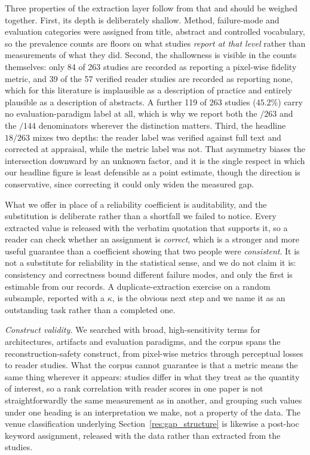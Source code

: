 \documentclass[review,authoryear]{elsarticle}
\begin{document}
Three properties of the extraction layer follow from that and should be weighed together.
First, its depth is deliberately shallow. Method, failure-mode and evaluation categories
were assigned from title, abstract and controlled vocabulary, so the prevalence counts are
floors on what studies \emph{report at that level} rather than measurements of what they
did. Second, the shallowness is visible in the counts themselves: only 84 of 263 studies
are recorded as reporting a pixel-wise fidelity metric, and 39 of the 57 verified reader
studies are recorded as reporting none, which for this literature is implausible as a
description of practice and entirely plausible as a description of abstracts. A further
119 of 263 studies ($45.2\%$) carry no evaluation-paradigm label at all, which is why we
report both the $/263$ and the $/144$ denominators wherever the distinction matters. Third,
the headline $18/263$ mixes two depths: the reader label was verified against full text and
corrected at appraisal, while the metric label was not. That asymmetry biases the
intersection downward by an unknown factor, and it is the single respect in which our
headline figure is least defensible as a point estimate, though the direction is
conservative, since correcting it could only widen the measured gap.

What we offer in place of a reliability coefficient is auditability, and the substitution is
deliberate rather than a shortfall we failed to notice. Every extracted value is released
with the verbatim quotation that supports it, so a reader can check whether an assignment is
\emph{correct}, which is a stronger and more useful guarantee than a coefficient showing
that two people were \emph{consistent}. It is not a substitute for reliability in the
statistical sense, and we do not claim it is: consistency and correctness bound different
failure modes, and only the first is estimable from our records. A duplicate-extraction
exercise on a random subsample, reported with a $\kappa$, is the obvious next step and we
name it as an outstanding task rather than a completed one.

\emph{Construct validity.} We searched with broad, high-sensitivity terms for
architectures, artifacts and evaluation paradigms, and the corpus spans the
reconstruction-safety construct, from pixel-wise metrics through perceptual losses to
reader studies. What the corpus cannot guarantee is that a metric means the same thing
wherever it appears: studies differ in what they treat as the quantity of interest, so
a rank correlation with reader scores in one paper is not straightforwardly the same
measurement as in another, and grouping such values under one heading is an
interpretation we make, not a property of the data. The venue classification
underlying Section~\ref{res:gap_structure} is likewise a post-hoc keyword assignment,
released with the data rather than extracted from the studies.
\end{document}
